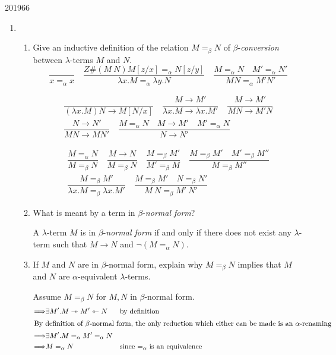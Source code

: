 \documentclass[10pt,\jkfside,a4paper]{article}
\begin{document}
\begin{examquestion}{2019}{6}{6}

\begin{enumerate}

\item \begin{enumerate}

\item Give an inductive definition of the relation $M =_\beta N$ of
$\beta$-\textit{conversion} between $\lambda$-terms $M$ and $N$.
\[
\dfrac{}{x =_\alpha x}
\quad
\dfrac{Z\#(M\ N) M[z/x] =_\alpha N[z/y]}{
\lambda x. M =_\alpha \lambda y. N
}
\quad
\dfrac{M =_\alpha N \quad M' =_\alpha N'}{M N =_\alpha M' N'}
\]

\begin{gather*}
\dfrac{}{(\lambda x. M)N \to M[N/x]}
\quad
\dfrac{M \to M'}{\lambda x. M \to \lambda x. M'}
\quad
\dfrac{M \to M'}{M N \to M' N}
\\
\dfrac{N \to N'}{M N \to M N'}
\quad
\dfrac{
M =_\alpha N \quad M \to M' \quad M' =_\alpha N
}{
N \to N'
}
\end{gather*}

\iffalse
\[
\dfrac{M =_\alpha N}{M \twoheadrightarrow N}
\quad
\dfrac{M \to M'}{M \twoheadrightarrow M'}
\quad
\dfrac{M \twoheadrightarrow M'\quad M' \to M''}{
M \twoheadrightarrow M''
}
\]
\fi

\begin{gather*}
\dfrac{M =_\alpha N}{M =_\beta N}
\quad
\dfrac{
M \to N
}{
M =_\beta N
}
\quad
\dfrac{M =_\beta M'}{M' =_\beta M}
\quad
\dfrac{M =_\beta M' \quad M' =_\beta M''}{M =_\beta M''}
\\
\dfrac{M =_\beta M'}{\lambda x. M =_\beta \lambda x. M'}
\quad
\dfrac{M =_\beta M' \quad N =_\beta N'}{
M\ N =_\beta M'\ N'
}
\end{gather*}

\item What is meant by a term in $\beta$-\textit{normal form}?

A $\lambda$-term $M$ is in $\beta$-\textit{normal form} if and only if
there does not exist any $\lambda$-term such that $M \to N$ and
$\neg(M =_\alpha N)$.

\item If $M$ and $N$ are in $\beta$-normal form, explain why $M =_\beta N$
implies that $M$ and $N$ are $\alpha$-equivalent $\lambda$-terms.

Assume $M =_\beta N$ for $M, N$ in $\beta$-normal form.
\begin{align*}
\Longrightarrow &\exists M'. M \twoheadrightarrow M' \twoheadleftarrow N &
& \text{by definition} \\
\intertext{By definition of $\beta$-normal form, the only reduction which
either can be made is an $\alpha$-renaming}
\Longrightarrow& \exists M'. M =_\alpha M' =_\alpha N &
& \\
\Longrightarrow& M =_{\alpha} N & & \text{since $=_\alpha$ is an equivalence}
\end{align*}


\end{enumerate}
\end{enumerate}
\end{examquestion}
\end{document}

